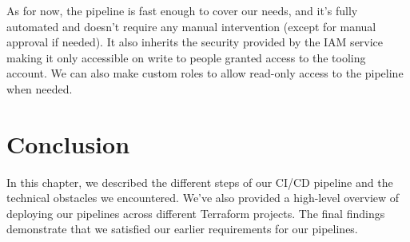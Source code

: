 As for now, the pipeline is fast enough to cover our needs, and it's fully automated and doesn't require any manual intervention (except for manual approval if needed). It also inherits the security provided by the IAM service making it only accessible on write to people granted access to the tooling account. We can also make custom roles to allow read-only access to the pipeline when needed. 
\clearpage

\section*{Conclusion}

In this chapter, we described the different steps of our CI/CD pipeline and the technical obstacles we encountered. We've also provided a high-level overview of deploying our pipelines across different Terraform projects. The final findings demonstrate that we satisfied our earlier requirements for our pipelines.

\qquad 
